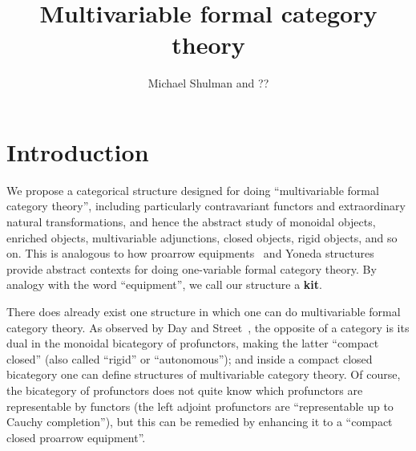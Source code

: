 \documentclass{amsart}
\title{Multivariable formal category theory}
\author{Michael Shulman and ??}
\begin{document}
\maketitle

\tableofcontents

\section{Introduction}
\label{sec:intro}

We propose a categorical structure designed for doing ``multivariable formal category theory'', including particularly contravariant functors and extraordinary natural transformations, and hence the abstract study of monoidal objects, enriched objects, multivariable adjunctions, closed objects, rigid objects, and so on.
This is analogous to how proarrow equipments~\cite{wood:proarrows-i} and Yoneda structures~\cite{street-walters:yoneda} provide abstract contexts for doing one-variable formal category theory.
By analogy with the word ``equipment'', we call our structure a \textbf{kit}.

There does already exist one structure in which one can do multivariable formal category theory.
As observed by Day and Street~\cite{ds:monbi-hopfagbd}, the opposite of a category is its dual in the monoidal bicategory of profunctors, making the latter ``compact closed'' (also called ``rigid'' or ``autonomous''); and inside a compact closed bicategory one can define structures of multivariable category theory.
Of course, the bicategory of profunctors does not quite know which profunctors are representable by functors (the left adjoint profunctors are ``representable up to Cauchy completion''), but this can be remedied by enhancing it to a ``compact closed proarrow equipment''.
\end{document}
